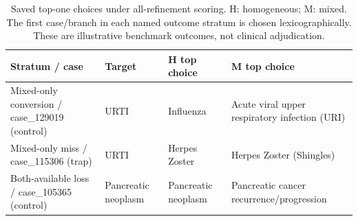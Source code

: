 \begin{table}[ht]\centering\small
\caption{Saved top-one choices under all-refinement scoring. H: homogeneous; M: mixed. The first case/branch in each named outcome stratum is chosen lexicographically. These are illustrative benchmark outcomes, not clinical adjudication.}\label{tab:savedexamples}
\begin{tabular}{p{.20\linewidth}p{.17\linewidth}p{.22\linewidth}p{.28\linewidth}}\toprule Stratum / case & Target & H top choice & M top choice \\ \midrule
Mixed-only conversion / case\_129019 (control) & URTI & Influenza & Acute viral upper respiratory infection (URI) \\
Mixed-only miss / case\_115306 (trap) & URTI & Herpes Zoster & Herpes Zoster (Shingles) \\
Both-available loss / case\_105365 (control) & Pancreatic neoplasm & Pancreatic neoplasm & Pancreatic cancer recurrence/progression \\
\bottomrule\end{tabular}\end{table}
